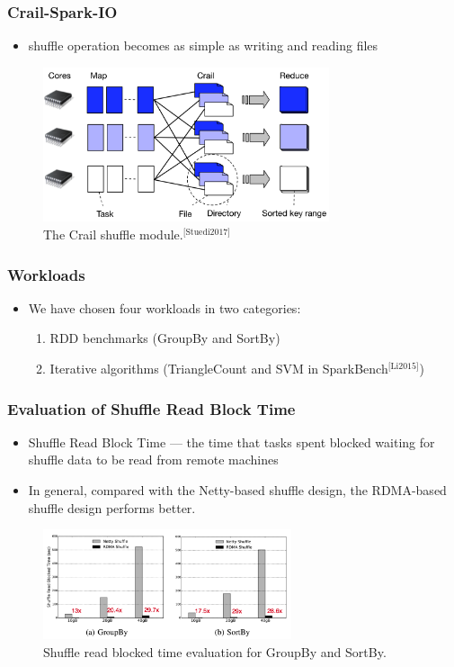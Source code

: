 \documentclass{beamer}
\begin{document}
\begin{frame}
  \frametitle{Crail-Spark-IO}
  \begin{itemize}
  \item shuffle operation becomes as simple as writing and reading files
  \end{itemize}
  \begin{figure}[!b]
    \centering 
    \includegraphics[width=0.75\textwidth]{crail-shuffle-module.png}
    \caption{The Crail shuffle module.$^{\text{[Stuedi2017]}}$}
    \label{fig:crail-shuffle-module}
  \end{figure}
\end{frame}

\begin{frame}
  \frametitle{Workloads}
  \begin{itemize}
  \item We have chosen four workloads in two categories:
    \begin{enumerate}
    \item RDD benchmarks (GroupBy and SortBy)
    \item Iterative algorithms (TriangleCount and SVM in
      SparkBench$^{\text{[Li2015]}}$)
    \end{enumerate}
  \end{itemize}
\end{frame}

\begin{frame}
  \frametitle{Evaluation of Shuffle Read Block Time}
  \begin{itemize}
  \item Shuffle Read Block Time --- the time that tasks spent blocked waiting
    for shuffle data to be read from remote machines
    \item In general, compared with the Netty-based shuffle design, the
      RDMA-based shuffle design performs better.
  \end{itemize}
  \begin{figure}[!b]
    \centering 
    \includegraphics[width=0.65\textwidth]{shuffle-read-block-time.png}
    \caption{Shuffle read blocked time evaluation for GroupBy and SortBy.}
    \label{fig:shuffle-read-block-time}
  \end{figure}
\end{frame}
\end{document}
